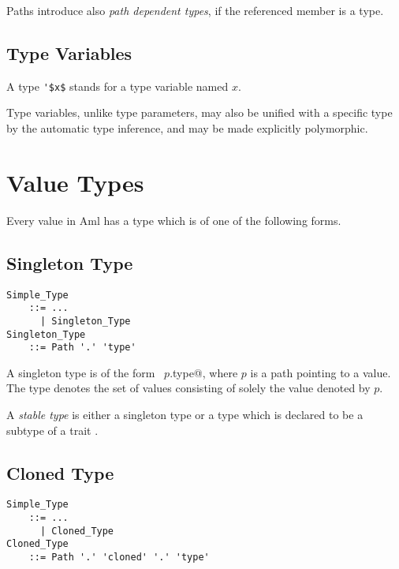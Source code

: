 Paths introduce also {\em path dependent types}, if the referenced member is a type. 





\subsection{Type Variables}
\label{sec:type-variables}

A type \lstinline!'$x$! stands for a type variable named $x$.

Type variables, unlike type parameters, may also be unified with a specific type by the automatic type inference, and may be made explicitly polymorphic. 





\section{Value Types}

Every value in Aml has a type which is of one of the following forms. 





\subsection{Singleton Type}
\label{sec:singleton-types}

\grammar\begin{lstlisting}
Simple_Type 
    ::= ...
      | Singleton_Type
Singleton_Type
    ::= Path '.' 'type'
\end{lstlisting}

A singleton type is of the form ~\lstinline@$p$.type@, where $p$ is a path pointing to a value. The type denotes the set of values consisting of solely the value denoted by $p$.

A {\em stable type} is either a singleton type or a type which is declared to be a subtype of a trait . 





\subsection{Cloned Type}
\label{sec:cloned-types}

\grammar\begin{lstlisting}
Simple_Type 
    ::= ...
      | Cloned_Type
Cloned_Type
    ::= Path '.' 'cloned' '.' 'type'
\end{lstlisting}

